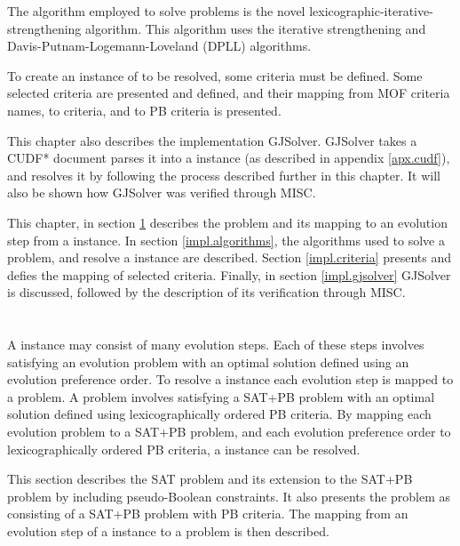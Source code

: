 The algorithm employed to solve \modelimpl problems is the novel lexicographic-iterative-strengthening algorithm.
This algorithm uses the iterative strengthening \citep{calistri1994iterative, le2010sat4j} and Davis-Putnam-Logemann-Loveland (DPLL) \citep{Davis1960, davis1962machine} algorithms.

To create an instance of \modelname to be resolved, some criteria must be defined. 
Some selected criteria are presented and defined, and their mapping from MOF criteria names, to \modelname criteria, and to PB criteria is presented. 

This chapter also describes the implementation GJSolver.
GJSolver takes a CUDF* document parses it into a \modelname instance (as described in appendix \ref{apx.cudf}),
and resolves it by following the process described further in this chapter.
It will also be shown how GJSolver was verified through MISC.

This chapter, in section \ref{impl.mapping} describes the \modelimpl problem and its mapping to an evolution step from a \modelname instance.
In section \ref{impl.algorithms}, the algorithms used to solve a \modelimpl problem, and resolve a \modelname instance are described.
Section \ref{impl.criteria} presents and defies the mapping of selected criteria.
Finally, in section \ref{impl.gjsolver} GJSolver is discussed, followed by the description of its verification through MISC.

\section{\modelimpl}
\label{impl.mapping}
A \modelname instance may consist of many evolution steps.
Each of these steps involves satisfying an evolution problem with an optimal solution defined using an evolution preference order.
To resolve a \modelname instance each evolution step is mapped to a \modelimpl problem.
A \modelimpl problem involves satisfying a SAT+PB problem with an optimal solution defined using lexicographically ordered PB criteria.
By mapping each evolution problem to a SAT+PB problem, and each evolution preference order to lexicographically ordered PB criteria,
a \modelname instance can be resolved.

This section describes the SAT problem and its extension to the SAT+PB problem by including pseudo-Boolean constraints.
It also presents the \modelimpl problem as consisting of a SAT+PB problem with PB criteria. 
The mapping from an evolution step of a \modelname instance to a \modelimpl problem is then described.

